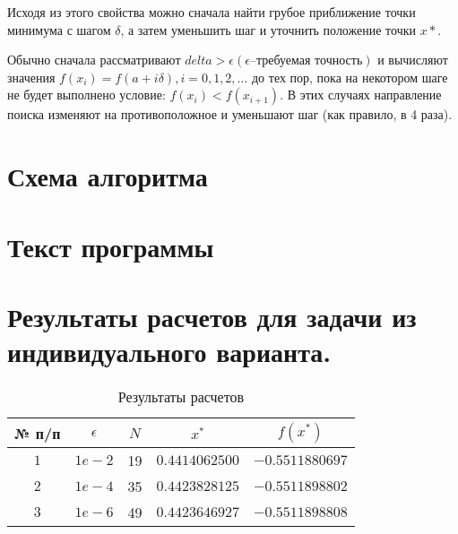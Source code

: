 Исходя из этого свойства можно сначала найти грубое приближение точки минимума с шагом $\delta$, а затем уменьшить шаг и уточнить положение точки $x*$.

Обычно сначала рассматривают $delta > \epsilon (\epsilon – \text{требуемая точность})$ и вычисляют значения $f(x_i) = f(a + i\delta), i = 0,1,2,\dots$ до тех пор, пока на некотором шаге не будет выполнено условие: $f(x_i) < f(x_{i+1})$. В этих
случаях направление поиска изменяют на противоположное и уменьшают шаг (как
правило, в 4 раза).

\section{Схема алгоритма}


\section{Текст программы}


\section{Результаты расчетов для задачи из индивидуального варианта.}

\begin{table}[h]
    \centering
    \small
    \caption{Результаты расчетов }
    \label{tbl:cmp}

    \begin{tabular}{|c|c|c|c|c|}
        \hline
        № п/п & $\epsilon$ & $N$ & $x^*$ & $f(x^*)$ \\\hline
        $1$ & $1e-2$ & 19 & $0.4414062500$ & $-0.5511880697$ \\\hline
        $2$ & $1e-4$ & 35 & $0.4423828125$ & $-0.5511898802$ \\\hline
        $3$ & $1e-6$ & 49 & $0.4423646927$ & $-0.5511898808$ \\\hline
    \end{tabular}
\end{table}